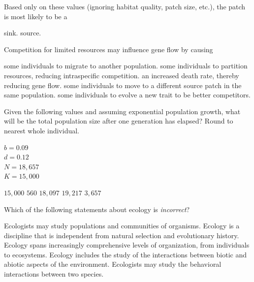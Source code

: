 Based only on these values (ignoring habitat quality, patch size, etc.), the patch is most likely to be a 

\begin{choices}
\correctchoice  sink.%
\choice  source. %
\end{choices}


\question
Competition for limited resources may influence gene flow by causing

\begin{choices}
\correctchoice some individuals to migrate to another population.%
\choice  some individuals to partition resources, reducing intraspecific competition.%
\choice  an increased death rate, thereby reducing gene flow.%
\choice  some individuals to move to a different source patch in the same population.%
\choice  some individuals to evolve a new trait to be better competitors.%
\end{choices}


\question
Given the following values and assuming exponential population growth, what will be the total population size after one generation has elapsed? Round to nearest whole individual.\vspace{1ex}

\begin{minipage}{1em}
\end{minipage}%
\hspace{2em}%
\begin{minipage}{1.5in}
$b = 0.09$ \\
$d = 0.12$ \\
$N = 18,657$\\
$K = 15,000$\\
\end{minipage}

\begin{choices}
\choice $15,000$%
\choice $560$%
\correctchoice $18,097$%
\choice $19,217$%
\choice $3,657$%
\end{choices}


\question
Which of the following statements about ecology is \emph{incorrect}? 

\begin{choices}
\choice Ecologists may study populations and communities of organisms. %
\correctchoice Ecology is a discipline that is independent from natural selection and evolutionary history. %
\choice Ecology spans increasingly comprehensive levels of organization, from individuals to ecosystems. %
\choice Ecology includes the study of the interactions between biotic and abiotic aspects of the environment. %
\choice Ecologists may study the behavioral interactions between two species.%
\end{choices}

